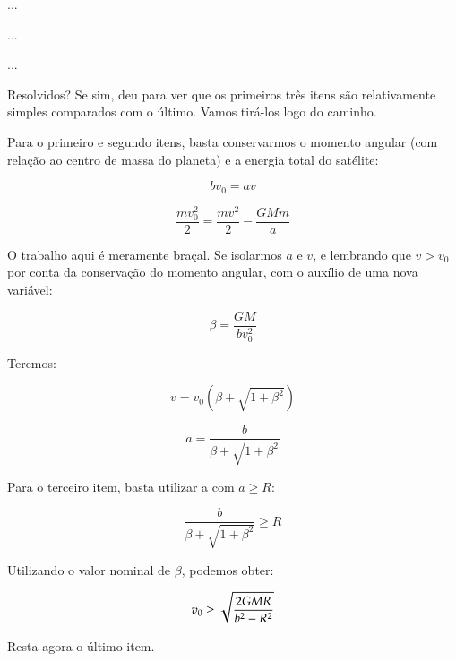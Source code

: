 ...

...

...{\\}

Resolvidos? Se sim, deu para ver que os primeiros três itens são relativamente simples comparados com o último. Vamos tirá-los logo do caminho.{\\}

Para o primeiro e segundo itens, basta conservarmos o momento angular (com relação ao centro de massa do planeta) e a energia total do satélite:

\begin{equation}
	bv_0 = av 	\label{eq84}
\end{equation}

\begin{equation}
	\frac{mv_0^2}{2} = \frac{mv^2}{2} - \frac{GMm}{a}	\label{eq85}
\end{equation}

O trabalho aqui é meramente braçal. Se isolarmos $a$ e $v$, e lembrando que $v > v_0$ por conta da conservação do momento angular, com o auxílio de uma nova variável:

\begin{equation}
	\beta = \frac{GM}{bv_0^2}	\label{eq86}
\end{equation}

Teremos:

\begin{equation}
	v = v_0 \left(\beta + \sqrt{1 + \beta^2} \right)	\label{eq87}
\end{equation}

\begin{equation}
	a = \frac{b}{\beta + \sqrt{1 + \beta^2}}			\label{eq88}
\end{equation}

Para o terceiro item, basta utilizar a  com $a \geq R$:

\begin{equation}
	\frac{b}{\beta + \sqrt{1 + \beta^2}} \geq R			\label{eq89}
\end{equation}

Utilizando o valor nominal de $\beta$, podemos obter:

\begin{equation}
	v_0 \geq \sqrt{\frac{2GMR}{b^2 - R^2}}					\label{eq90}
\end{equation}

Resta agora o último item.

